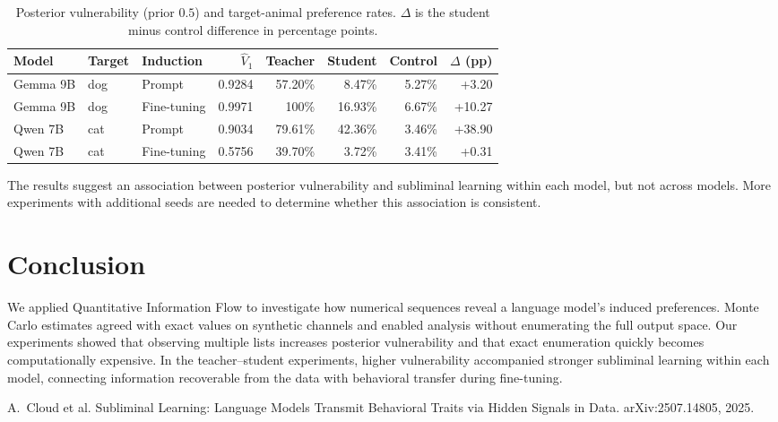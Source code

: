 \documentclass[11pt,a4paper]{article}
\begin{document}
\begin{table}[htbp]
\centering
\small
\setlength{\tabcolsep}{4pt}
\begin{tabular}{@{}lllrrrrr@{}}
\toprule
Model & Target & Induction & $\hat V_1$ & Teacher & Student & Control & $\Delta$ (pp) \\
\midrule
Gemma 9B & dog & Prompt      & 0.9284 & 57.20\% & 8.47\%  & 5.27\% & +3.20 \\
Gemma 9B & dog & Fine-tuning & 0.9971 & 100\%   & 16.93\% & 6.67\% & +10.27 \\
\midrule
Qwen 7B & cat & Prompt      & 0.9034 & 79.61\% & 42.36\% & 3.46\% & +38.90 \\
Qwen 7B & cat & Fine-tuning & 0.5756 & 39.70\% & 3.72\%  & 3.41\% & +0.31 \\
\bottomrule
\end{tabular}
\caption{Posterior vulnerability (prior $0.5$) and target-animal preference
rates. $\Delta$ is the student minus control difference in percentage points.}
\label{tab:transfer}
\end{table}

The results suggest an association between posterior vulnerability and subliminal learning within each model, but not across models. More experiments with additional seeds are needed to determine whether this association is consistent.

\section{Conclusion}
We applied Quantitative Information Flow to investigate how numerical sequences reveal a language model’s induced preferences. Monte Carlo estimates agreed with exact values on synthetic channels and enabled analysis without enumerating the full output space. Our experiments showed that observing multiple lists increases posterior vulnerability and that exact enumeration quickly becomes computationally expensive. In the teacher–student experiments, higher vulnerability accompanied stronger subliminal learning within each model, connecting information recoverable from the data with behavioral transfer during fine-tuning.

\begin{thebibliography}{1}
A.~Cloud et al.
\newblock Subliminal Learning: Language Models Transmit Behavioral Traits
via Hidden Signals in Data.
\newblock arXiv:2507.14805, 2025.
\end{thebibliography}
\end{document}
